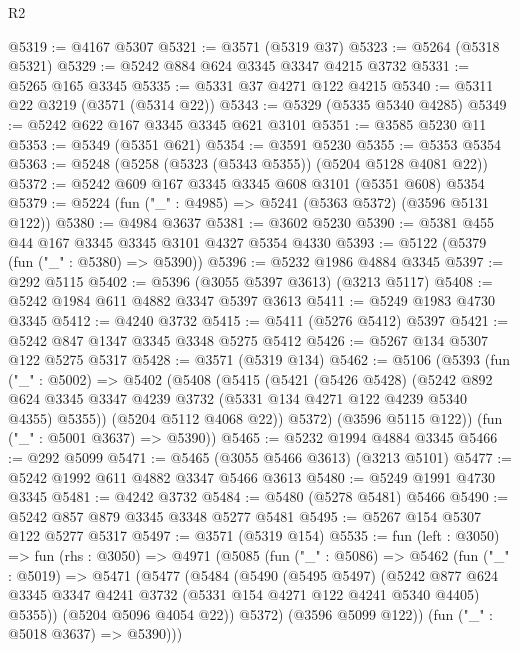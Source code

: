\begin{lexlean}{R2}
\begin{coremodule}
@5319 := @4167 @5307
@5321 := @3571 (@5319 @37)
@5323 := @5264 (@5318 @5321)
@5329 := @5242 @884 @624 @3345 @3347 @4215 @3732
@5331 := @5265 @165 @3345
@5335 := @5331 @37 @4271 @122 @4215
@5340 := @5311 @22 @3219 (@3571 (@5314 @22))
@5343 := @5329 (@5335 @5340 @4285)
@5349 := @5242 @622 @167 @3345 @3345 @621 @3101
@5351 := @3585 @5230 @11
@5353 := @5349 (@5351 @621)
@5354 := @3591 @5230
@5355 := @5353 @5354
@5363 := @5248 (@5258 (@5323 (@5343 @5355)) (@5204 @5128 @4081 @22))
@5372 := @5242 @609 @167 @3345 @3345 @608 @3101 (@5351 @608) @5354
@5379 := @5224 (fun ("_" : @4985) => @5241 (@5363 @5372) (@3596 @5131 @122))
@5380 := @4984 @3637
@5381 := @3602 @5230
@5390 := @5381 @455 @44 @167 @3345 @3345 @3101 @4327 @5354 @4330
@5393 := @5122 (@5379 (fun ("_" : @5380) => @5390))
@5396 := @5232 @1986 @4884 @3345
@5397 := @292 @5115
@5402 := @5396 (@3055 @5397 @3613) (@3213 @5117)
@5408 := @5242 @1984 @611 @4882 @3347 @5397 @3613
@5411 := @5249 @1983 @4730 @3345
@5412 := @4240 @3732
@5415 := @5411 (@5276 @5412) @5397
@5421 := @5242 @847 @1347 @3345 @3348 @5275 @5412
@5426 := @5267 @134 @5307 @122 @5275 @5317
@5428 := @3571 (@5319 @134)
@5462 := @5106
    (@5393
      (fun ("_" : @5002) =>
      @5402
        (@5408
          (@5415
            (@5421
              (@5426 @5428)
              (@5242
                @892
                @624
                @3345
                @3347
                @4239
                @3732
                (@5331 @134 @4271 @122 @4239 @5340 @4355)
                @5355))
            (@5204 @5112 @4068 @22))
          @5372)
        (@3596 @5115 @122))
      (fun ("_" : @5001 @3637) => @5390))
@5465 := @5232 @1994 @4884 @3345
@5466 := @292 @5099
@5471 := @5465 (@3055 @5466 @3613) (@3213 @5101)
@5477 := @5242 @1992 @611 @4882 @3347 @5466 @3613
@5480 := @5249 @1991 @4730 @3345
@5481 := @4242 @3732
@5484 := @5480 (@5278 @5481) @5466
@5490 := @5242 @857 @879 @3345 @3348 @5277 @5481
@5495 := @5267 @154 @5307 @122 @5277 @5317
@5497 := @3571 (@5319 @154)
@5535 := fun (left : @3050) =>
  fun (rhs : @3050) =>
  @4971
    (@5085
      (fun ("_" : @5086) =>
      @5462
        (fun ("_" : @5019) =>
        @5471
          (@5477
            (@5484
              (@5490
                (@5495 @5497)
                (@5242
                  @877
                  @624
                  @3345
                  @3347
                  @4241
                  @3732
                  (@5331 @154 @4271 @122 @4241 @5340 @4405)
                  @5355))
              (@5204 @5096 @4054 @22))
            @5372)
          (@3596 @5099 @122))
        (fun ("_" : @5018 @3637) => @5390)))

\end{coremodule}
\end{lexlean}
